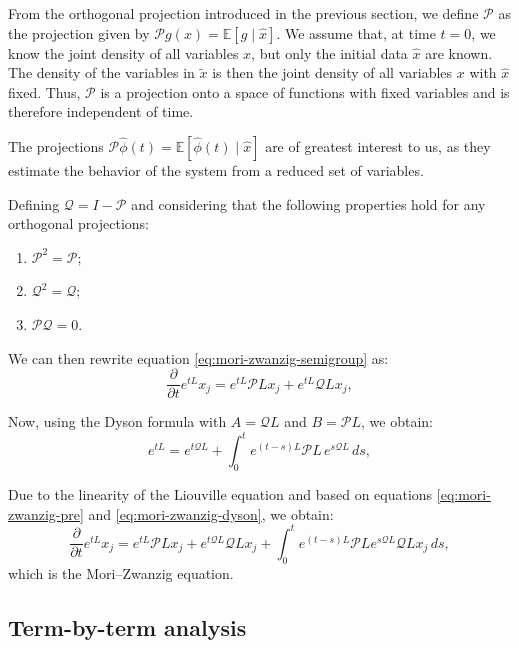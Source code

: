 \documentclass[12pt]{article}
\begin{document}
From the orthogonal projection introduced in the previous section, we define $\mathcal{P}$ as the projection given by $\mathcal{P}g(x) = \mathbb{E}[g \mid \hat{x}]$. We assume that, at time $t = 0$, we know the joint density of all variables $x$, but only the initial data $\hat{x}$ are known. The density of the variables in $\tilde{x}$ is then the joint density of all variables $x$ with $\hat{x}$ fixed. Thus, $\mathcal{P}$ is a projection onto a space of functions with fixed variables and is therefore independent of time.

The projections $\mathcal{P}\hat{\phi}(t) = \mathbb{E}[\hat{\phi}(t) \mid \hat{x}]$ are of greatest interest to us, as they estimate the behavior of the system from a reduced set of variables.

Defining $\mathcal{Q} = I - \mathcal{P}$ and considering that the following properties hold for any orthogonal projections:
\begin{enumerate}
	\item $\mathcal{P}^2 = \mathcal{P}$;
	\item $\mathcal{Q}^2 = \mathcal{Q}$;
	\item $\mathcal{P}\mathcal{Q} = 0$.
\end{enumerate}

We can then rewrite equation \eqref{eq:mori-zwanzig-semigroup} as:
\begin{equation}
	\frac{\partial }{\partial t}e^{tL}x_j = e^{tL}\mathcal{P}Lx_j + e^{tL}\mathcal{Q}Lx_j,
	\label{eq:mori-zwanzig-pre}
\end{equation}

Now, using the Dyson formula with $A = \mathcal{Q}L$ and $B = \mathcal{P}L$, we obtain:
\begin{equation}
	e^{tL} = e^{t\mathcal{Q}L} + \int_0^t e^{(t-s)L} \mathcal{P}L \, e^{s\mathcal{Q}L} \, ds,
	\label{eq:mori-zwanzig-dyson}
\end{equation}

Due to the linearity of the Liouville equation and based on equations \eqref{eq:mori-zwanzig-pre} and \eqref{eq:mori-zwanzig-dyson}, we obtain:
\begin{equation}
	\frac{\partial}{\partial t} e^{tL} x_j = e^{tL} \mathcal{P}L x_j + e^{t\mathcal{Q}L} \mathcal{Q}L x_j + \int_0^t e^{(t-s)L} \mathcal{P}L e^{s\mathcal{Q}L} \mathcal{Q}L x_j \, ds,
	\label{eq:mori-zwanzig}
\end{equation}
which is the Mori–Zwanzig equation.


\subsection{Term-by-term analysis}
\end{document}
